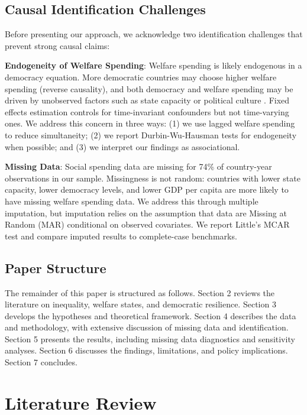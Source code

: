 \documentclass[11pt,letterpaper]{article}
\begin{document}
\subsection{Causal Identification Challenges}

Before presenting our approach, we acknowledge two identification challenges that prevent strong causal claims:

\textbf{Endogeneity of Welfare Spending}: Welfare spending is likely endogenous in a democracy equation. More democratic countries may choose higher welfare spending (reverse causality), and both democracy and welfare spending may be driven by unobserved factors such as state capacity or political culture \cite{Huber2019}. Fixed effects estimation controls for time-invariant confounders but not time-varying ones. We address this concern in three ways: (1) we use lagged welfare spending to reduce simultaneity; (2) we report Durbin-Wu-Hausman tests for endogeneity when possible; and (3) we interpret our findings as associational.

\textbf{Missing Data}: Social spending data are missing for 74\% of country-year observations in our sample. Missingness is not random: countries with lower state capacity, lower democracy levels, and lower GDP per capita are more likely to have missing welfare spending data. We address this through multiple imputation, but imputation relies on the assumption that data are Missing at Random (MAR) conditional on observed covariates. We report Little's MCAR test and compare imputed results to complete-case benchmarks.

\subsection{Paper Structure}

The remainder of this paper is structured as follows. Section 2 reviews the literature on inequality, welfare states, and democratic resilience. Section 3 develops the hypotheses and theoretical framework. Section 4 describes the data and methodology, with extensive discussion of missing data and identification. Section 5 presents the results, including missing data diagnostics and sensitivity analyses. Section 6 discusses the findings, limitations, and policy implications. Section 7 concludes.

\section{Literature Review}
\end{document}
